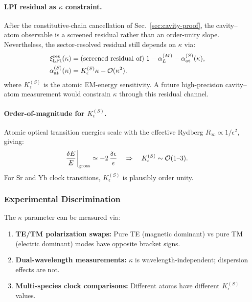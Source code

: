 \paragraph{LPI residual as $\kappa$ constraint.}
After the constitutive-chain cancellation of Sec.~\ref{sec:cavity-proof}, the cavity--atom observable is a screened residual rather than an order-unity slope.  Nevertheless, the sector-resolved residual still depends on $\kappa$ via:
\begin{align}
\xi_{\rm LPI}^{\rm res}(\kappa)
  &= \text{(screened residual of)}\;
     1 - \alpha_L^{(M)} - \alpha_{\rm at}^{(S)}(\kappa),
     \notag\\
\alpha_{\rm at}^{(S)}(\kappa)
  &= K_\epsilon^{(S)}\kappa + \mathcal{O}(\kappa^2).
\end{align}
where $K_\epsilon^{(S)}$ is the atomic EM-energy sensitivity.  A future high-precision cavity--atom measurement would constrain $\kappa$ through this residual channel.

\paragraph{Order-of-magnitude for $K_\epsilon^{(S)}$.}
Atomic optical transition energies scale with the effective Rydberg $R_\infty \propto 1/\epsilon^2$, giving:
\begin{equation}
\frac{\delta E}{E}\bigg|_{\rm gross} \simeq -2\,\frac{\delta\epsilon}{\epsilon} \quad \Rightarrow \quad K_\epsilon^{(S)} \sim \mathcal{O}(1\text{--}3).
\end{equation}
For Sr and Yb clock transitions, $K_\epsilon^{(S)}$ is plausibly order unity.

\subsubsection{Experimental Discrimination}

The $\kappa$ parameter can be measured via:
\begin{enumerate}
\item \textbf{TE/TM polarization swaps:} Pure TE (magnetic dominant) vs pure TM (electric dominant) modes have opposite bracket signs.
\item \textbf{Dual-wavelength measurements:} $\kappa$ is wavelength-independent; dispersion effects are not.
\item \textbf{Multi-species clock comparisons:} Different atoms have different $K_\epsilon^{(S)}$ values.
\end{enumerate}

